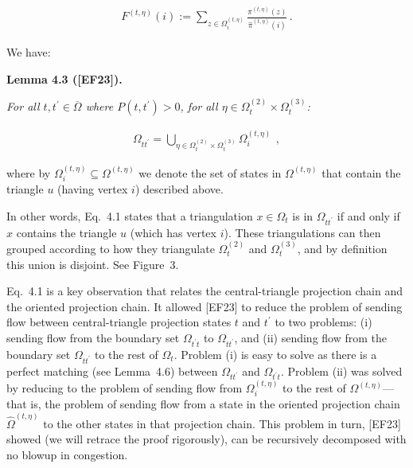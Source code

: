 \[\begin{gathered}
F^{(t,\eta)}(i):=\sum_{z\in\Omega_{i}^{(t,\eta)}}\frac{\pi^{(t,\eta)}(z)}{\hat{\pi}^{(t,\eta)}(i)}\,.
\end{gathered}\]




We have:\par





\par\medskip\noindent\textbf{\textbf{Lemma 4.3}\textbf{ }([EF23])\textbf{.}}\par



\emph{For all $t,t^{\prime}\in\overline{\Omega}$ where $P(t,t^{\prime})>0$, for all $\eta\in\Omega_{t}^{(2)}\times\Omega_{t}^{(3)}$:}\par


\[\begin{gathered}
\Omega_{tt^{\prime}}=\bigcup_{\eta\in\Omega_{t}^{(2)}\times\Omega_{t}^{(3)}}\Omega_{i}^{(t,\eta)}\ \,,
\end{gathered}\]






where by $\Omega_{i}^{(t,\eta)}\subseteq\Omega^{(t,\eta)}$ we denote the set of states in $\Omega^{(t,\eta)}$ that contain the triangle $u$ (having vertex $i$) described above.\par




In other words, Eq. 4.1 states that a triangulation $x\in\Omega_{t}$ is in $\Omega_{tt^{\prime}}$ if and only if $x$ contains the triangle $u$ (which has vertex $i$). These triangulations can then grouped according to how they triangulate $\Omega_{t}^{(2)}$ and $\Omega_{t}^{(3)}$, and by definition this union is disjoint. See Figure 3.\par




Eq. 4.1 is a key observation that relates the central-triangle projection chain and the oriented projection chain. It allowed [EF23] to reduce the problem of sending flow between central-triangle projection states $t$ and $t^{\prime}$ to two problems: (i) sending flow from the boundary set $\Omega_{t^{\prime}t}$ to $\Omega_{tt^{\prime}}$, and (ii) sending flow from the boundary set $\Omega_{tt^{\prime}}$ to the rest of $\Omega_{t}$. Problem (i) is easy to solve as there is a perfect matching (see Lemma 4.6) between $\Omega_{tt^{\prime}}$ and $\Omega_{t^{\prime}t}$. Problem (ii) was solved by reducing to the problem of sending flow from $\Omega_{i}^{(t,\eta)}$ to the rest of $\Omega^{(t,\eta)}$—that is, the problem of sending flow from a state in the oriented projection chain $\hat{\Omega}^{(t,\eta)}$ to the other states in that projection chain. This problem in turn, [EF23] showed (we will retrace the proof rigorously), can be recursively decomposed with no blowup in congestion.\par



